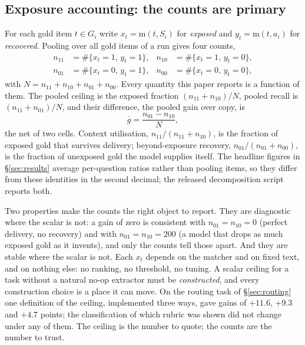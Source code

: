 \documentclass[10pt,twocolumn]{article}
\begin{document}
\subsection{Exposure accounting: the counts are primary}\label{sec:accounting}
For each gold item $t\in G_i$ write $x_t=\mathrm{m}(t,S_i)$ for \emph{exposed} and $y_t=\mathrm{m}(t,a_i)$ for \emph{recovered}. Pooling over all gold items of a run gives four counts,
\[
\begin{aligned}
  n_{11}&=\#\{x_t{=}1,\,y_t{=}1\}, & n_{10}&=\#\{x_t{=}1,\,y_t{=}0\},\\
  n_{01}&=\#\{x_t{=}0,\,y_t{=}1\}, & n_{00}&=\#\{x_t{=}0,\,y_t{=}0\},
\end{aligned}
\]
with $N=n_{11}+n_{10}+n_{01}+n_{00}$. Every quantity this paper reports is a function of them. The pooled ceiling is the exposed fraction $(n_{11}+n_{10})/N$, pooled recall is $(n_{11}+n_{01})/N$, and their difference, the pooled gain over copy, is
\[
  \bar g=\frac{n_{01}-n_{10}}{N},
\]
the net of two cells. Context utilisation, $n_{11}/(n_{11}+n_{10})$, is the fraction of exposed gold that survives delivery; beyond-exposure recovery, $n_{01}/(n_{01}+n_{00})$, is the fraction of unexposed gold the model supplies itself. The headline figures in \S\ref{sec:results} average per-question ratios rather than pooling items, so they differ from these identities in the second decimal; the released decomposition script reports both.

Two properties make the counts the right object to report. They are diagnostic where the scalar is not: a gain of zero is consistent with $n_{01}=n_{10}=0$ (perfect delivery, no recovery) and with $n_{01}=n_{10}=200$ (a model that drops as much exposed gold as it invents), and only the counts tell those apart. And they are stable where the scalar is not. Each $x_t$ depends on the matcher and on fixed text, and on nothing else: no ranking, no threshold, no tuning. A scalar ceiling for a task without a natural no-op extractor must be \emph{constructed}, and every construction choice is a place it can move. On the routing task of \S\ref{sec:routing} one definition of the ceiling, implemented three ways, gave gains of $+11.6$, $+9.3$ and $+4.7$ points; the classification of which rubric was shown did not change under any of them. The ceiling is the number to quote; the counts are the number to trust.
\end{document}
